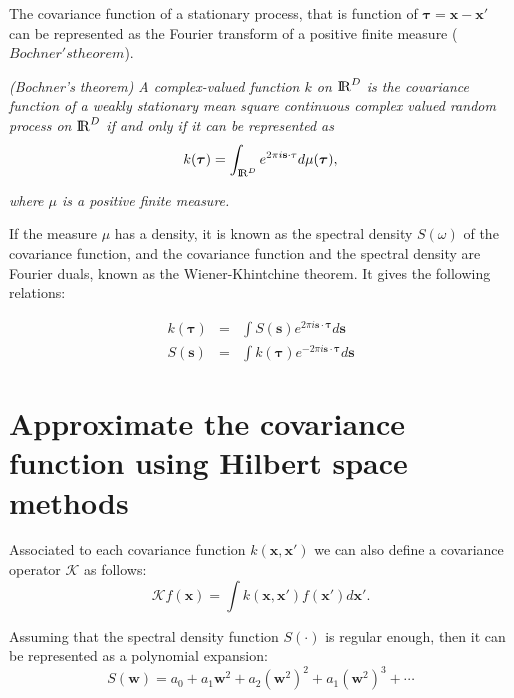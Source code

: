 \documentclass[]{interact}
\theoremstyle{plain}%
\theoremstyle{definition}
\theoremstyle{remark}
\begin{document}
The covariance function of a stationary process, that is function of $\boldsymbol{\tau}=\mathbf{x-x'}$ can be represented as the Fourier transform of a positive finite measure ($Bochner's theorem$). 

\vspace{0.2cm}
\textit{(Bochner’s theorem) A complex-valued function $k$ on ${\rm I\!R}^D$ is the covariance function of a weakly stationary mean square continuous complex valued random process on ${\rm I\!R}^D$ if and only if it can be represented as}
%
\begin{equation}
k(\boldsymbol{\tau})= \int_{{\rm I\!R}^D} e^{2\pi i \mathbf{s} \cdot \mathbf{\tau}} d\mu(\boldsymbol{\tau}), \nonumber 
\end{equation}

\textit{where $\mu$ is a positive finite measure.} 

\vspace{0.2cm}
If the measure $\mu$ has a density, it is known as the spectral density $S(\omega)$ of the covariance function, and the covariance function and the spectral density are Fourier duals, known as the Wiener-Khintchine theorem. It gives the following relations:

\begin{eqnarray}
k(\boldsymbol{\tau})&=& \int S(\mathbf{s}) e^{2\pi i \mathbf{s} \cdot \boldsymbol{\tau}} d\mathbf{s}  \nonumber \\
%
S(\mathbf{s})&=& \int k(\boldsymbol{\tau}) e^{-2\pi i \mathbf{s} \cdot \boldsymbol{\tau}} d\mathbf{s}  \nonumber
\end{eqnarray}

\section{Approximate the covariance function using Hilbert space methods}

Associated to each covariance function $k(\mathbf{x},\mathbf{x}')$ we can also define a covariance operator $\mathcal{K}$ as follows:
%
\begin{equation}
\mathcal{K} f(\mathbf{x}) = \int k(\mathbf{x},\mathbf{x}') f(\mathbf{x}') d\mathbf{x}'.
\end{equation} 

Assuming that the spectral density function $S(\cdot)$ is regular enough, then it can be represented as a polynomial expansion:
%
\begin{equation}
S(\mathbf{w})=a_0+a_1\mathbf{w}^2+a_2(\mathbf{w}^2)^2+a_1(\mathbf{w}^2)^3+\cdots
\end{equation}
\end{document}
